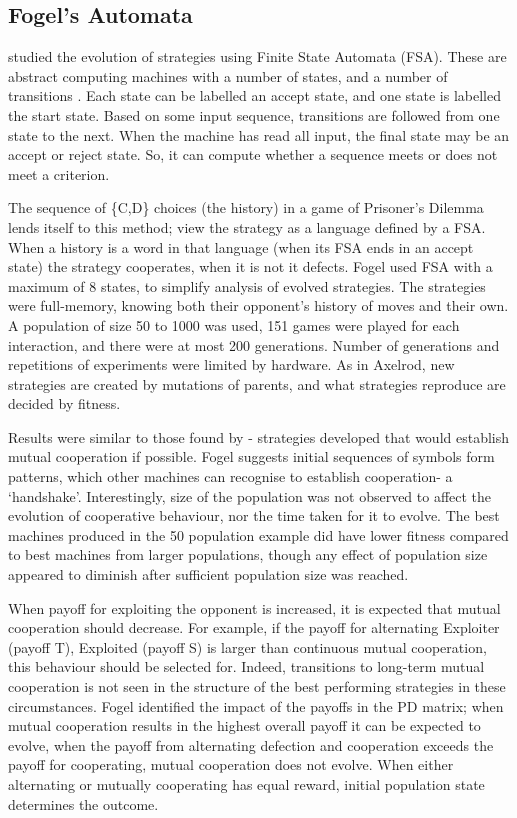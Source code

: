 \documentclass[a4paper,11pt,bcshonoursthesis,singlespace,twoside]{cssethesis}
\begin{document}
\subsection{Fogel's Automata}
\citet{fogel1993evolving} studied the evolution of strategies using Finite State Automata (FSA). 
These are abstract computing machines with a number of states, and a number of transitions \citep{Sipser2006}. 
Each state can be labelled an accept state, and one state is labelled the start state. 
Based on some input sequence, transitions are followed from one state to the next. 
When the machine has read all input, the final state may be an accept or reject state. 
So, it can compute whether a sequence meets or does not meet a criterion. 

The sequence of \{C,D\} choices (the history) in a game of Prisoner's Dilemma lends itself to this method; view the strategy as a language defined by a FSA. When a history is a word in that language (when its FSA ends in an accept state) the strategy cooperates, when it is not it defects. Fogel used FSA with a maximum of 8 states, to simplify analysis of evolved strategies. The strategies were full-memory, knowing both their opponent's history of moves and their own. 
A population of size 50 to 1000 was used, 151 games were played for each interaction, and there were at most 200 generations. 
Number of generations and repetitions of experiments were limited by hardware. As in Axelrod, new strategies are created by mutations of parents, and what strategies reproduce are decided by fitness. 

Results were similar to those found by \citep{Axelrod1997}- strategies developed that would establish mutual cooperation if possible. Fogel suggests initial sequences of symbols form patterns, which other machines can recognise to establish cooperation- a `handshake'. 
Interestingly, size of the population was not observed to affect the evolution of cooperative behaviour, nor the time taken for it to evolve. The best machines produced in the 50 population example did have lower fitness compared to best machines from larger populations, though any effect of population size appeared to diminish after sufficient population size was reached. 

When payoff for exploiting the opponent is increased, it is expected that mutual cooperation should decrease. For example, if the payoff for alternating Exploiter (payoff T), Exploited (payoff S) is larger than continuous mutual cooperation, this behaviour should be selected for. Indeed, transitions to long-term mutual cooperation is not seen in the structure of the best performing strategies in these circumstances. Fogel identified the impact of the payoffs in the PD matrix; when mutual cooperation results in the highest overall payoff it can be expected to evolve, when the payoff from alternating defection and cooperation exceeds the payoff for cooperating, mutual cooperation does not evolve. When either alternating or mutually cooperating has equal reward, initial population state determines the outcome. 
\end{document}

